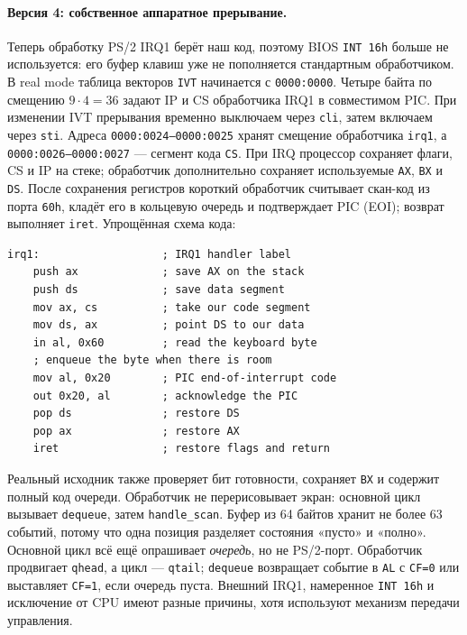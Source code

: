 \paragraph{Версия 4: собственное аппаратное прерывание.}
Теперь обработку PS/2 IRQ1 берёт наш код, поэтому BIOS \texttt{INT 16h}
больше не используется: его буфер клавиш уже не пополняется стандартным
обработчиком. В real mode таблица векторов \texttt{IVT} начинается с
\texttt{0000:0000}. Четыре байта по смещению $9\cdot4=36$ задают IP и CS
обработчика IRQ1 в совместимом PIC. При изменении IVT прерывания временно
выключаем через \texttt{cli}, затем включаем через \texttt{sti}.
Адреса \texttt{0000:0024--0000:0025} хранят смещение обработчика
\texttt{irq1}, а \texttt{0000:0026--0000:0027} --- сегмент кода \texttt{CS}.
При IRQ процессор сохраняет флаги, CS и IP на стеке; обработчик
дополнительно сохраняет используемые \texttt{AX}, \texttt{BX} и \texttt{DS}.
После сохранения регистров короткий обработчик считывает скан-код
из порта \texttt{60h}, кладёт его в кольцевую очередь и подтверждает
PIC (EOI); возврат выполняет \texttt{iret}. Упрощённая схема кода:
\begin{lstlisting}[basicstyle=\ttfamily\small]
irq1:                   ; IRQ1 handler label
    push ax             ; save AX on the stack
    push ds             ; save data segment
    mov ax, cs          ; take our code segment
    mov ds, ax          ; point DS to our data
    in al, 0x60         ; read the keyboard byte
    ; enqueue the byte when there is room
    mov al, 0x20        ; PIC end-of-interrupt code
    out 0x20, al        ; acknowledge the PIC
    pop ds              ; restore DS
    pop ax              ; restore AX
    iret                ; restore flags and return
\end{lstlisting}
Реальный исходник также проверяет бит готовности, сохраняет \texttt{BX}
и содержит полный код очереди. Обработчик не перерисовывает экран:
основной цикл вызывает \texttt{dequeue}, затем \texttt{handle\_scan}.
Буфер из 64 байтов хранит не более 63 событий, потому что одна позиция
разделяет состояния «пусто» и «полно». Основной цикл всё ещё опрашивает
\emph{очередь}, но не PS/2-порт. Обработчик продвигает \texttt{qhead},
а цикл --- \texttt{qtail}; \texttt{dequeue} возвращает событие в
\texttt{AL} с \texttt{CF=0} или выставляет \texttt{CF=1}, если очередь пуста.
Внешний IRQ1, намеренное \texttt{INT 16h}
и исключение от CPU имеют разные причины, хотя используют механизм
передачи управления.


